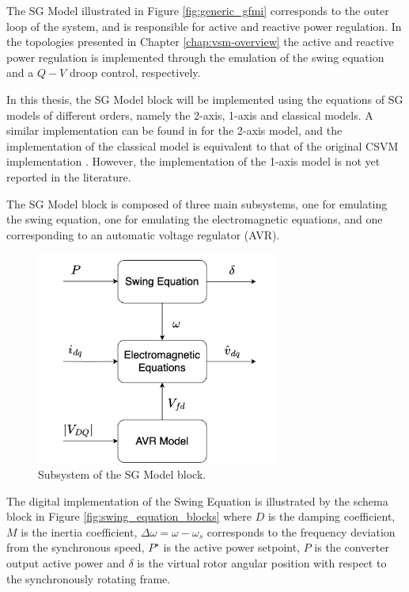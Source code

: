 The SG Model illustrated in Figure \ref{fig:generic_gfmi} corresponds to the
outer loop of the system, and is responsible for active and reactive power
regulation. In the topologies presented in Chapter \ref{chap:vsm-overview} the
active and reactive power regulation is implemented through the emulation of the
swing equation and a $Q-V$ droop control, respectively.

In this thesis, the SG Model block will be implemented using the equations of SG
models of different orders, namely the 2-axis, 1-axis and classical models. A
similar implementation can be found in \cite{ma2017vsg, zhang2013improved} for
the 2-axis model, and the implementation of the classical model is equivalent to
that of the original CSVM implementation \cite{darco2015vsm}. However, the
implementation of the 1-axis model is not yet reported in the literature.

The SG Model block is composed of three main subsystems, one for emulating the
swing equation, one for emulating the electromagnetic equations, and one
corresponding to an automatic voltage regulator (AVR).

\begin{figure}[ht!]
    \centering
    \includegraphics[width=8cm]{images/sm_overall_model.png}
    \caption{Subsystem of the SG Model block.}
    \label{fig:sm_overall_model}
\end{figure}

The digital implementation of the Swing Equation is illustrated by the schema
block in Figure \ref{fig:swing_equation_blocks} where $D$ is the damping
coefficient, $M$ is the inertia coefficient, $\Delta\omega = \omega - \omega_s$
corresponds to the frequency deviation from the synchronous speed, $P^{\star}$
is the active power setpoint, $P$ is the converter output active power and
$\delta$ is the virtual rotor angular position with respect to the synchronously
rotating frame.

